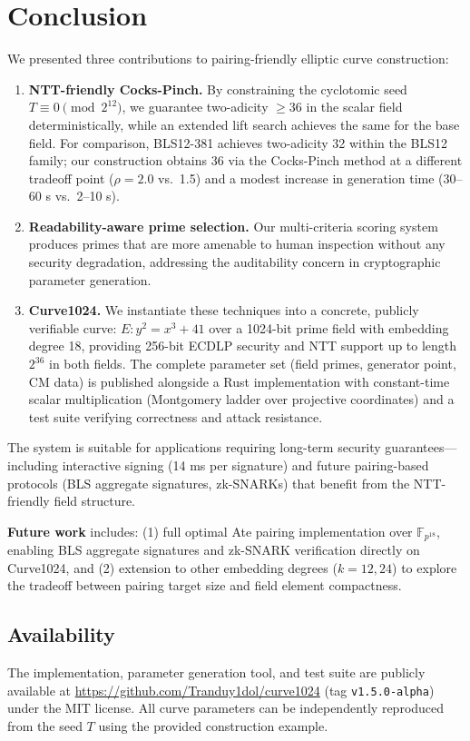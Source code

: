 \section{Conclusion}

We presented three contributions to pairing-friendly elliptic curve
construction:

\begin{enumerate}
\def\labelenumi{\arabic{enumi}.}
\item
  \textbf{NTT-friendly Cocks-Pinch.} By constraining the cyclotomic seed
  \(T \equiv 0 \pmod{2^{12}}\), we guarantee two-adicity \(\geq 36\) in
  the scalar field deterministically, while an extended lift search
  achieves the same for the base field. For comparison, BLS12-381
  achieves two-adicity 32 within the BLS12 family; our construction
  obtains 36 via the Cocks-Pinch method at a different tradeoff point
  (\(\rho = 2.0\) vs.~1.5) and a modest increase in generation time
  (30--60 s vs.~2--10 s).
\item
  \textbf{Readability-aware prime selection.} Our multi-criteria scoring
  system produces primes that are more amenable to human inspection
  without any security degradation, addressing the auditability concern
  in cryptographic parameter generation.
\item
  \textbf{Curve1024.} We instantiate these techniques into a concrete,
  publicly verifiable curve: \(E: y^2 = x^3 + 41\) over a 1024-bit prime
  field with embedding degree 18, providing 256-bit ECDLP security and
  NTT support up to length \(2^{36}\) in both fields. The complete
  parameter set (field primes, generator point, CM data) is published
  alongside a Rust implementation with constant-time scalar
  multiplication (Montgomery ladder over projective coordinates) and a
  test suite verifying correctness and attack resistance.
\end{enumerate}

The system is suitable for applications requiring long-term security
guarantees---including interactive signing (14 ms per signature) and
future pairing-based protocols (BLS aggregate signatures, zk-SNARKs)
that benefit from the NTT-friendly field structure.

\textbf{Future work} includes: (1) full optimal Ate pairing
implementation over \(\mathbb{F}_{p^{18}}\), enabling BLS aggregate
signatures and zk-SNARK verification directly on Curve1024, and (2)
extension to other embedding degrees (\(k = 12, 24\)) to explore the
tradeoff between pairing target size and field element compactness.

\subsection{Availability}\label{availability}

The implementation, parameter generation tool, and test suite are
publicly available at \url{https://github.com/Tranduy1dol/curve1024}
(tag \texttt{v1.5.0-alpha}) under the MIT license. All curve parameters
can be independently reproduced from the seed \(T\) using the provided
construction example.
